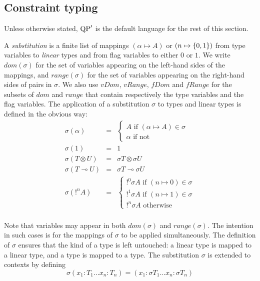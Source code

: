 \subsection{Constraint typing}

Unless otherwise stated, ${\rm QP}'$ is the default language for the rest of this section.

\begin{defn} A \textit{substitution} is a finite list of mappings $(\alpha \mapsto A)$ or $(n \mapsto \{0, 1\})$
	from type variables to \textit{linear} types and from flag variables to either $0$ or $1$.
	We write $dom(\sigma)$ for the set of variables appearing on the left-hand sides of the mappings, and $range(\sigma)$ for the set of variables
	appearing on the right-hand sides of pairs in $\sigma$. We also use $vDom$, $vRange$, $fDom$ and $fRange$ for the subsets of $dom$ and $range$
	that contain respectively the type variables and the flag variables.
	The application of a substitution $\sigma$ to types and linear types is defined in the obvious way:
	$$
	\begin{array}{lcl}
		\sigma (\alpha) &=& \left\{ \begin{array}{l}
		                              A \text{ if } (\alpha \mapsto A) \in \sigma \\
      		                        \alpha \text{ if not}
		                            \end{array} \right. \\
		\sigma(1) &=& 1 \\
		\sigma(T \otimes U) &=& \sigma T \otimes \sigma U \\
		\sigma(T \multimap U) &=& \sigma T \multimap \sigma U \\
		\sigma(!^n A) &=& \left\{ \begin{array}{l}
																	!^{0} \sigma A \text{ if } (n \mapsto 0) \in \sigma \\
																	!^{1} \sigma A \text{ if } (n \mapsto 1) \in \sigma \\
																	!^n \sigma A \text{ otherwise}
																\end{array} \right. \\
	\end{array}
	$$
\end{defn}	

Note that variables may appear in both $dom(\sigma)$ and $range(\sigma)$. The intention in such cases is for the mappings of $\sigma$ to
be applied simultaneously. The definition of $\sigma$ ensures that the kind of a type is left untouched: a linear type is mapped to a linear
type, and a type is mapped to a type. The substitution $\sigma$ is extended to contexts by defining
 		$$\sigma (x_1 : T_1 \dots x_n : T_n) = (x_1 : \sigma T_1 \dots x_n : \sigma T_n)$$
 		
